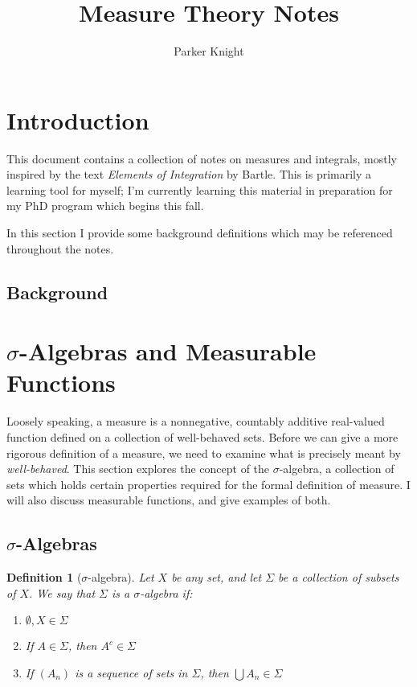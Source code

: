 \documentclass{article}
\title{Measure Theory Notes}
\author{Parker Knight}
\newtheorem{definition}[theorem]{Definition}
\begin{document}
\maketitle
\tableofcontents
\newpage


\section{Introduction}

This document contains a collection of notes on measures and integrals,
mostly inspired by the text \textit{Elements of Integration} by Bartle. This
is primarily a learning tool for myself; I'm currently learning this material in
preparation for my PhD program which begins this fall.

In this section I provide some background definitions which may be referenced throughout
the notes.

\subsection{Background}

\newpage

\section{$\sigma$-Algebras and Measurable Functions} 

Loosely speaking, a measure is a nonnegative, countably additive real-valued
function defined on a collection of
well-behaved sets. Before we can give a more rigorous definition of a measure,
we need to examine what is precisely meant by \textit{well-behaved}. This
section explores the concept of the $\sigma$-algebra, a collection of sets which
holds certain properties required for the formal definition of measure.
I will also discuss measurable functions, and give examples of both.

\subsection{$\sigma$-Algebras}

\begin{definition}[$\sigma$-algebra]\label{def:sigma-alg}
    Let $X$ be any set, and let $\Sigma$ be a collection of subsets of $X$.
    We say that $\Sigma$ is a \textit{$\sigma$-algebra} if:
    \begin{enumerate}
        \item $\emptyset, X \in \Sigma$
        \item If $A \in \Sigma$, then $A^c \in \Sigma$
        \item If $(A_n)$ is a sequence of sets in $\Sigma$, then $\bigcup A_n
        \in \Sigma$
    \end{enumerate}
    
\end{definition}
\end{document}
